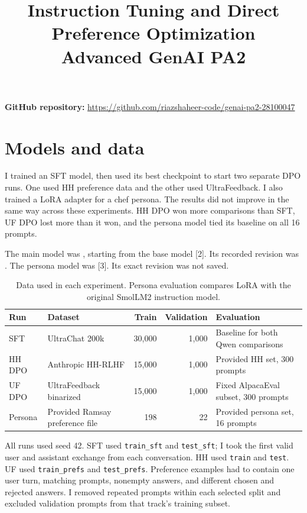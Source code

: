 \documentclass[11pt,a4paper]{article}
\title{Instruction Tuning and Direct Preference Optimization\\\large Advanced GenAI PA2}
\author{}
\date{}
\newcommand{\code}[1]{\texttt{\small #1}}
\begin{document}
\maketitle
\vspace{-2.5em}
\textbf{GitHub repository:} \url{https://github.com/riazshaheer-code/genai-pa2-28100047}

\section{Models and data}

I trained an SFT model, then used its best checkpoint to start two separate DPO runs. One used HH preference data and the other used UltraFeedback. I also trained a LoRA adapter for a chef persona. The results did not improve in the same way across these experiments. HH DPO won more comparisons than SFT, UF DPO lost more than it won, and the persona model tied its baseline on all 16 prompts.

The main model was , starting from the base model [2]. Its recorded revision was . The persona model was  [3]. Its exact revision was not saved.

\begin{table}[htbp]
\centering\small
\begin{tabularx}{\linewidth}{@{}lYrrY@{}}
\toprule
Run & Dataset & Train & Validation & Evaluation \\
\midrule
SFT & UltraChat 200k & 30,000 & 1,000 & Baseline for both Qwen comparisons \\
HH DPO & Anthropic HH-RLHF & 15,000 & 1,000 & Provided HH set, 300 prompts \\
UF DPO & UltraFeedback binarized & 15,000 & 1,000 & Fixed AlpacaEval subset, 300 prompts \\
Persona & Provided Ramsay preference file & 198 & 22 & Provided persona set, 16 prompts \\
\bottomrule
\end{tabularx}
\caption{Data used in each experiment. Persona evaluation compares LoRA with the original SmolLM2 instruction model.}
\end{table}

All runs used seed 42. SFT used \code{train\_sft} and \code{test\_sft}; I took the first valid user and assistant exchange from each conversation. HH used \code{train} and \code{test}. UF used \code{train\_prefs} and \code{test\_prefs}. Preference examples had to contain one user turn, matching prompts, nonempty answers, and different chosen and rejected answers. I removed repeated prompts within each selected split and excluded validation prompts from that track's training subset.
\end{document}
